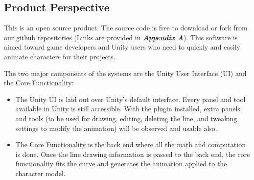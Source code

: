 \subsection{Product Perspective}
This is an open source product. The source code is free to download or fork from our
github repositories (Links are provided in \hyperref[App:AppendixSD]{\textbf{\textit{Appendix A}}}). This software
is aimed toward game developers and Unity users who need to quickly and easily
animate characters for their projects.

The two major components of the systems are the Unity User Interface (UI) and the Core Functionality:

\begin{itemize}
\item The Unity UI is laid out over Unity's default interface. Every panel and tool available in Unity is still accessible. With the plugin installed, extra panels and tools (to be used for drawing, editing, deleting the line, and tweaking settings to modify the animation) will be observed and usable also.

\item The Core Functionality is the back end where all the math and computation is done. Once the line drawing information is passed to the back end, the core functionality fits the curve and generates the animation applied to the character model.

\end{itemize}
